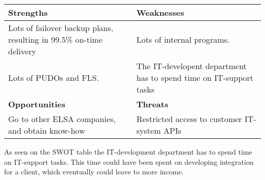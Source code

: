 \begin{tabular}{| p{} | p{} |}
\hline
\rowcolor{GR}
\textbf{Strengths} & \textbf{Weaknesses} \\ \hline
Lots of failover backup plans, resulting in 99.5\% on-time delivery & Lots of internal programs.
\\ \hline
Lots of PUDOs and FLS. & The IT-developent department has to spend time on IT-support tasks \\ \hline \hline
\rowcolor{GR}
\textbf{Opportunities} & \textbf{Threats} \\ \hline
Go to other ELSA companies, and obtain know-how & Restricted access to customer IT-system APIs \\ \hline
\end{tabular}
\qquad

As seen on the SWOT table the IT-development department has to spend time on IT-support tasks. This time could have been spent on developing integration for a client, which eventually could leave to more income.